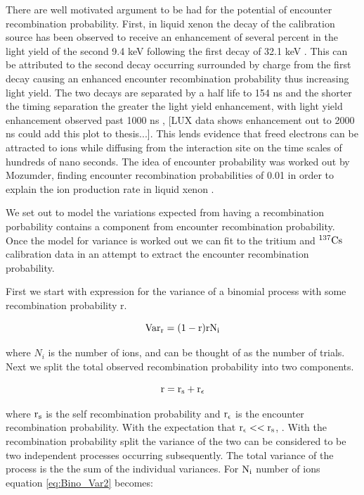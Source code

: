 There are well motivated argument to be had for the potential of encounter recombination probability. First, in liquid xenon the decay of the calibration source \KrCal has been observed to receive an enhancement of several percent in the light yield of the second 9.4 keV following the first decay of 32.1 keV \cite{Start_Kr}. This can be attributed to the second decay occurring surrounded by charge from the first decay causing an enhanced encounter recombination probability thus increasing light yield.  The two decays are separated by a half life to 154 ns \cite{83Kr_HalfLife_1} and the shorter the timing separation the greater the light yield enhancement, with light yield enhancement observed past 1000 ns \cite{Kastens}, \cite{Baudis} [LUX data shows enhancement out to 2000 ns could add this plot to thesis...]. This lends evidence that freed electrons can be attracted to ions while diffusing from the interaction site on the time scales of hundreds of nano seconds. The idea of encounter probability was worked out by Mozumder, finding encounter recombination probabilities of 0.01 in order to explain the ion production rate in liquid xenon \cite{Mozumder}. 

We set out to model the variations expected from having a recombination porbability contains a component from encounter recombination probability. Once the model for variance is worked out we can fit to the tritium and $\rm^{137}Cs$ calibration data in an attempt to extract the encounter recombination probability.


First we start with expression for the variance of a binomial process with some recombination probability r. 

\begin{equation}
\rm Var_r= (1-r)rN_i
\label{eq:Bino_Var2}
\end{equation}

\noindent where $N_i$ is the number of ions, and can be thought of as the number of trials. Next we split the total observed recombination probability into two components.

\begin{equation}
\rm r=r_s + r_\epsilon
\label{eq:rs}
\end{equation}

\noindent where $\rm r_s$ is the self recombination probability and $\rm r_\epsilon$ is the encounter recombination probability. With the expectation that  $\rm r_\epsilon << r_s$, \cite{Mozumder}. With the recombination probability split the variance of the two can be considered to be two independent processes occurring subsequently. The total variance of the process is the the sum of the individual variances. For $\rm N_i$ number of ions equation \ref{eq:Bino_Var2} becomes:

